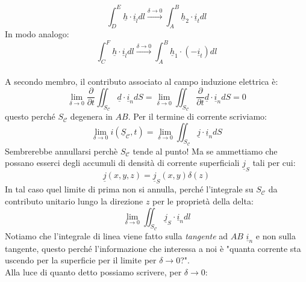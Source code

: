 \documentclass{book}
\begin{document}
        \begin{equation}
            \int_{D} ^{E} \underline{h} \cdot \underline{i}_{l}dl \stackrel{\delta \to 0}{\to} \int_{A} ^{B} \underline{h}_{2} \cdot \underline{i}_{t} dl
        \end{equation}
        In modo analogo:
        \begin{equation}
            \int_{C} ^{F} \underline{h} \cdot \underline{i}_{l}dl \stackrel{\delta \to 0}{\to} \int_{A} ^{B} \underline{h}_{1} \cdot (-\underline{i}_{t}) dl
        \end{equation}
        \\ A secondo membro, il contributo associato al campo induzione elettrica è:
        \begin{equation}
            \lim_{\delta \to 0} \frac{\partial}{ \partial t} \iint_{S_{\mathcal{C}}} \underline{d} \cdot \underline{i}_{n}dS = \lim_{\delta \to 0} \iint_{S_{\mathcal{C}}} \frac{\partial}{\partial t} \underline{d} \cdot \underline{i}_{n} dS = 0
        \end{equation}
        questo perché $S_{\mathcal{C}}$ degenera in $AB$. Per il termine di corrente scriviamo:
        \begin{equation}
            \lim_{\delta \to 0} i(\underline{S}_{\mathcal{C}}, t) = \lim_{\delta \to 0} \iint_{S_{\mathcal{C}}} \underline{j} \cdot \underline{i}_{n}dS
        \end{equation}
        Sembrerebbe annullarsi perchè $S_{\mathcal{C}}$ tende al punto! Ma se ammettiamo che possano esserci degli accumuli di densità di corrente superficiali $\underline{j}_{S}$ tali per cui:
        \begin{equation}
            \underline{j}(x,y,z) = \underline{j}_{S}(x,y) \delta (z)
        \end{equation}
        In tal caso quel limite di prima non si annulla, perché l'integrale su $S_{\mathcal{C}}$ da contributo unitario lungo la direzione $z$ per le proprietà della delta:
        \begin{equation}
            \lim_{\delta \to 0} \iint_{S_{\mathcal{C}}} \underline{j}_{S} \cdot \underline{i}_{n}dl
        \end{equation}
        Notiamo che l'integrale di linea viene fatto sulla \textit{tangente} ad $AB$ $\underline{i}_{n}$ e non sulla tangente, questo perché l'informazione che interessa a noi è "quanta corrente sta uscendo per la superficie per il limite per $\delta \to 0$?". \\
        Alla luce di quanto detto possiamo scrivere, per $\delta \to 0$:
\end{document}
